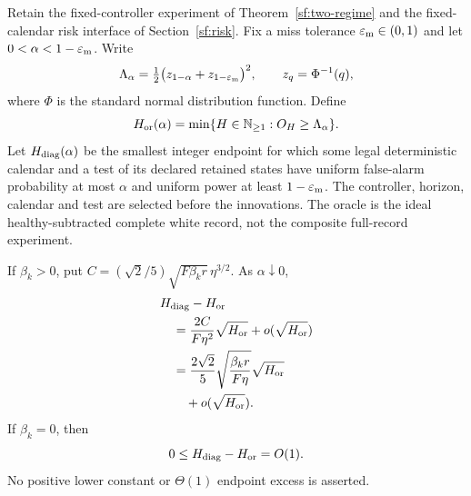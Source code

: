 
\begin{corollary}
\label{sf:fixed-endpoint-cor}
Retain the fixed-controller experiment of Theorem~\ref{sf:two-regime}
and the fixed-calendar risk interface of Section~\ref{sf:risk}.
Fix a miss tolerance $\varepsilon_{\rm m}\in(0,1)$ and let
$0<\alpha<1-\varepsilon_{\rm m}$. Write
\begin{equation}\label{sf:endpoint-threshold}
\Lambda_\alpha=\tfrac12
 \bigl(z_{1-\alpha}+z_{1-\varepsilon_{\rm m}}\bigr)^2,
\qquad z_q=\Phi^{-1}(q),
\end{equation}
where $\Phi$ is the standard normal distribution function. Define
\begin{equation}\label{sf:endpoint-oracle}
H_{\rm or}(\alpha)=\min\{H\in\mathbb N_{\ge1}:O_H\ge\Lambda_\alpha\}.
\end{equation}
Let $H_{\rm diag}(\alpha)$ be the smallest integer endpoint for which
some legal deterministic calendar and a test of its declared retained states
have uniform false-alarm probability at most $\alpha$ and uniform power at
least $1-\varepsilon_{\rm m}$. The controller, horizon, calendar and test
are selected before the innovations. The oracle is the ideal
healthy-subtracted complete white record, not the composite full-record
experiment.

If $\beta_k>0$, put
$C=(\sqrt2/5)\sqrt{F\beta_k r}\,\eta^{3/2}$. As $\alpha\downarrow0$,
\begin{equation}\label{sf:endpoint-positive}
\begin{aligned}
&H_{\rm diag}-H_{\rm or}\\
&\quad=\frac{2C}{F\eta^2}\sqrt{H_{\rm or}}+o(\sqrt{H_{\rm or}})\\
&\quad=\frac{2\sqrt2}{5}\sqrt{\frac{\beta_k r}{F\eta}}
   \sqrt{H_{\rm or}}\\
&\qquad+o(\sqrt{H_{\rm or}}).
\end{aligned}
\end{equation}
If $\beta_k=0$, then
\begin{equation}\label{sf:endpoint-zero}
0\le H_{\rm diag}-H_{\rm or}=O(1).
\end{equation}
No positive lower constant or $\Theta(1)$ endpoint excess is asserted.


\end{corollary}
